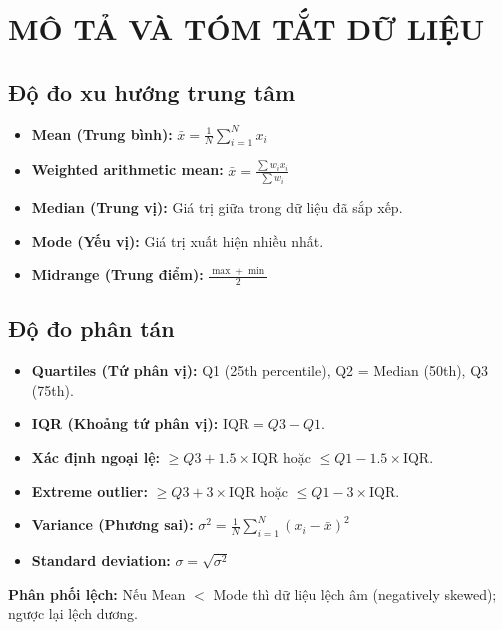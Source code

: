 \documentclass[10pt]{article}
\begin{document}
\section{MÔ TẢ VÀ TÓM TẮT DỮ LIỆU}

\subsection{Độ đo xu hướng trung tâm}

\begin{itemize}
    \item \textbf{Mean (Trung bình):} $\bar{x} = \frac{1}{N}\sum_{i=1}^{N} x_i$
    \item \textbf{Weighted arithmetic mean:} $\bar{x} = \frac{\sum w_i x_i}{\sum w_i}$
    \item \textbf{Median (Trung vị):} Giá trị giữa trong dữ liệu đã sắp xếp.
    \item \textbf{Mode (Yếu vị):} Giá trị xuất hiện nhiều nhất.
    \item \textbf{Midrange (Trung điểm):} $\frac{\max + \min}{2}$
\end{itemize}

\subsection{Độ đo phân tán}

\begin{itemize}
    \item \textbf{Quartiles (Tứ phân vị):} Q1 (25th percentile), Q2 = Median (50th), Q3 (75th).
    \item \textbf{IQR (Khoảng tứ phân vị):} $\text{IQR} = Q3 - Q1$.
    \item \textbf{Xác định ngoại lệ:} $\geq Q3 + 1.5 \times \text{IQR}$ hoặc $\leq Q1 - 1.5 \times \text{IQR}$.
    \item \textbf{Extreme outlier:} $\geq Q3 + 3 \times \text{IQR}$ hoặc $\leq Q1 - 3 \times \text{IQR}$.
    \item \textbf{Variance (Phương sai):} $\sigma^2 = \frac{1}{N}\sum_{i=1}^{N}(x_i - \bar{x})^2$
    \item \textbf{Standard deviation:} $\sigma = \sqrt{\sigma^2}$
\end{itemize}

\textbf{Phân phối lệch:} Nếu Mean $<$ Mode thì dữ liệu lệch âm (negatively skewed); ngược lại lệch dương.
\end{document}

